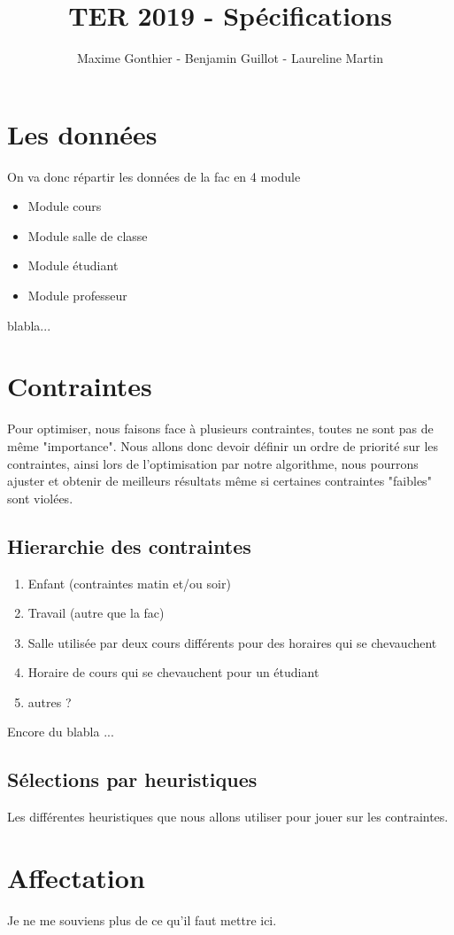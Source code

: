 \documentclass[a4paper,11pt]{article}
\title{TER 2019 - Spécifications}
\author{Maxime Gonthier - Benjamin Guillot - Laureline Martin}
\begin{document}
	\clearpage
	\maketitle

\newpage
\section{Les données}
	On va donc répartir les données de la fac en 4 module\\
	\begin{itemize}
		\item Module cours
		\item Module salle de classe
		\item Module étudiant
		\item Module professeur
	\end{itemize}
	blabla...\\
\section{Contraintes}
	Pour optimiser, nous faisons face à plusieurs contraintes, toutes ne sont pas 
	de même "importance". Nous allons donc devoir définir un ordre de priorité sur 
	les contraintes, ainsi lors de l'optimisation par notre algorithme, nous 
	pourrons ajuster et obtenir de meilleurs résultats même si certaines contraintes
	"faibles" sont violées.\\
	\subsection{Hierarchie des contraintes}
		\begin{enumerate}
			\item Enfant (contraintes matin et/ou soir)
			\item Travail (autre que la fac)
			\item Salle utilisée par deux cours différents pour des horaires 
				qui se chevauchent
			\item Horaire de cours qui se chevauchent pour un étudiant
			\item autres ?
		\end{enumerate}
	Encore du blabla ...\\
	\subsection{Sélections par heuristiques}
		Les différentes heuristiques que nous allons utiliser pour jouer sur les 
		contraintes. \\
\section{Affectation}
	Je ne me souviens plus de ce qu'il faut mettre ici. \\
\end{document}
